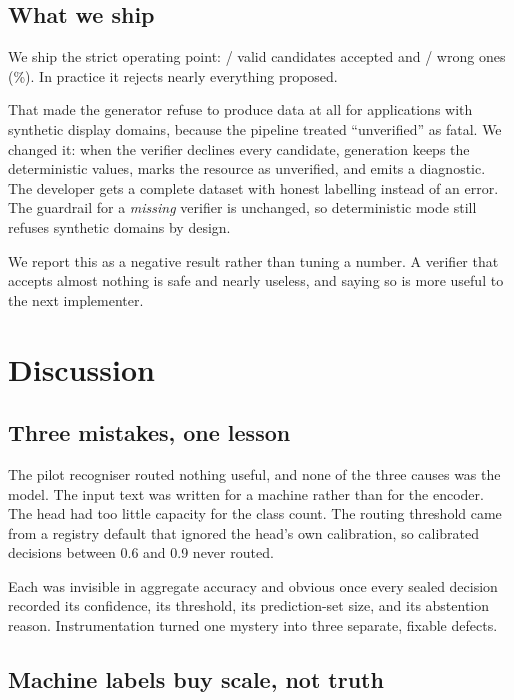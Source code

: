\documentclass[journal]{IEEEtran}
\begin{document}
\subsection{What we ship}

We ship the strict operating point:
\RelevancePositivesAccepted{}/\RelevancePositives{} valid candidates
accepted and \RelevanceNegativesAccepted{}/\RelevanceNegatives{} wrong
ones (\RelevanceNegativeRate\%). In practice it rejects nearly
everything proposed.

That made the generator refuse to produce data at all for applications
with synthetic display domains, because the pipeline treated
``unverified'' as fatal. We changed it: when the verifier declines every
candidate, generation keeps the deterministic values, marks the resource
as unverified, and emits a diagnostic. The developer gets a complete
dataset with honest labelling instead of an error. The guardrail for a
\emph{missing} verifier is unchanged, so deterministic mode still
refuses synthetic domains by design.

We report this as a negative result rather than tuning a number. A
verifier that accepts almost nothing is safe and nearly useless, and
saying so is more useful to the next implementer.

\section{Discussion}
\label{sec:discussion}

\subsection{Three mistakes, one lesson}

The pilot recogniser routed nothing useful, and none of the three causes
was the model. The input text was written for a machine rather than for
the encoder. The head had too little capacity for the class count. The
routing threshold came from a registry default that ignored the head's
own calibration, so calibrated decisions between 0.6 and 0.9 never
routed.

Each was invisible in aggregate accuracy and obvious once every sealed
decision recorded its confidence, its threshold, its prediction-set
size, and its abstention reason. Instrumentation turned one mystery into
three separate, fixable defects.

\subsection{Machine labels buy scale, not truth}
\end{document}
